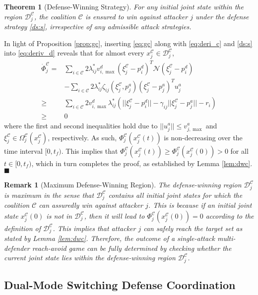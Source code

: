 \documentclass[journal]{IEEEtran}
\newtheorem{Theorem}{\bf Theorem}
\newtheorem{Remark}{\bf Remark}
\newenvironment{Proof}{\noindent{\em Proof:\/}}{\hfill $\blacksquare$\par}
\newcommand{\n}{\mathscr{N}}
\newcommand{\D}{\mathcal{D}}
\newcommand{\C}{\mathcal{C}}
\newcommand{\1}{\mathbf{1}}
\begin{document}
\begin{Theorem}[Defense-Winning Strategy]\label{thm:dws}
For any initial joint state within the region $\D^\C_j$, the coalition $\C$ is ensured to win against attacker $j$ under the defense strategy \eqref{ds:s}, irrespective of any admissible attack strategies.
\end{Theorem}

\begin{Proof}
In light of Proposition \ref{prop:gc}, inserting \eqref{eq:gc} along with \eqref{eq:deri_c} and \eqref{ds:s} into \eqref{eq:deriv_d} reveals that for almost every $x^\C_j\in \D^\C_j$,
\begin{equation*}
    \begin{split}
	    \dot{\Phi}^\C_j=&\sum_{i\in \C}2\lambda_{ij}^*v^d_{i,\max}(\xi^\C_j-p^d_i)^T\n(\xi^\C_j-p^d_i)\\
	    &-\sum_{i\in \C}2\lambda_{ij}^*\zeta_{ij}(\xi^\C_j,p^a_j)(\xi^\C_j-p^a_j)^Tu^a_j\\
	    \geq&\sum_{i\in \C}2v^d_{i,\max}\lambda_{ij}^*(||\xi^\C_j-p^d_i||-\gamma_{ij}||\xi^\C_j-p^a_j||-r_i)\\
	    \geq& 0
	\end{split}
\end{equation*}
where the first and second inequalities hold due to $||u^a_j||\leq v^{a}_{j,\max}$ and $\xi^\C_j\in \Omega^\C_j(x^\C_j)$, respectively. As such, $\Phi^\C_j(x^\C_j(t))$ is non-decreasing over the time interval $[0,t_f)$. This implies that $\Phi^\C_j(x^\C_j(t))\geq\Phi^\C_j(x^\C_j(0))>0$ for all $t\in [0,t_f)$, which in turn completes the proof, as established by Lemma \ref{lem:dwc}.
\end{Proof}

\begin{Remark}[Maximum Defense-Winning Region]
The defense-winning region $\D^\C_j$ is \textit{maximum} in the sense that $\D^\C_j$ contains all initial joint states for which the coalition $\C$ can assuredly win against attacker $j$. This is because if an initial joint state $x^\C_j(0)$ is not in $\D^\C_j$, then it will lead to $\Phi^\C_j(x^\C_j(0))=0$ according to the definition of $\D^\C_j$. This implies that attacker $j$ can safely reach the target set as stated by Lemma \ref{lem:dwc}. Therefore, the outcome of a single-attack multi-defender reach-avoid game can be fully determined by checking whether the current joint state lies within the defense-winning region $\D^\C_j$.
\end{Remark}

\subsection{Dual-Mode Switching Defense Coordination}
\end{document}
